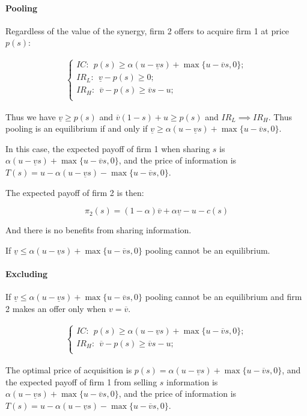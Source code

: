 \documentclass[a4paper,leqno]{article}%
\renewcommand{\a}{\alpha}
\newcommand{\uv}{\underline{v}}
\newcommand{\ov}{\overline{v}}
\begin{document}
\paragraph{Pooling}

Regardless of the value of the synergy, firm 2 offers to acquire firm 1 at price $p(s)$:

\begin{align}
\begin{cases}
    IC:~~ p(s)\geq \a(u-\uv s)+\max\{u-\ov s,0\};\\ 
    IR_L:~~ \uv -p(s)\geq 0;\\
    IR_H:~~ \ov -p(s)\geq \ov s-u;\\ 
\end{cases}
\end{align}


Thus we have $\uv \geq p(s)$ and $\ov(1-s)+u\geq p(s)$ and $IR_L\implies IR_H$. Thus pooling is an equilibrium if and only if $\uv\geq \a(u-\uv s)+\max\{u-\ov s,0\}$. 

In this case, the expected payoff of firm 1 when sharing $s$ is $\a(u-\uv s)+\max\{u-\ov s,0\}$, and the price of information is $T(s)=u-\a(u-\uv s)-\max\{u-\ov s,0\}$. 

The expected payoff of firm 2 is then:

\[
\pi_2(s)=(1-\a) \ov +\a\uv -u-c(s)
\]


And there is no benefits from sharing information. 

If $\uv\leq \a(u-\uv s)+\max\{u-\ov s,0\}$ pooling cannot be an equilibrium. 


\paragraph{Excluding}

If $\uv\leq \a(u-\uv s)+\max\{u-\ov s,0\}$ pooling cannot be an equilibrium and firm 2 makes an offer only when $v=\ov$. 

\begin{align}
\begin{cases}
    IC:~~ p(s)\geq \a(u-\uv s)+\max\{u-\ov s,0\};\\ 
    IR_H:~~ \ov -p(s)\geq \ov s-u;\\ 
\end{cases}
\end{align}

The optimal price of acquisition is $p(s)=\a(u-\uv s)+\max\{u-\ov s,0\}$, and the expected payoff of firm 1 from selling $s$ information is $\a(u-\uv s)+\max\{u-\ov s,0\}$, and the price of information is $T(s)=u-\a(u-\uv s)-\max\{u-\ov s,0\}$.
\end{document}

